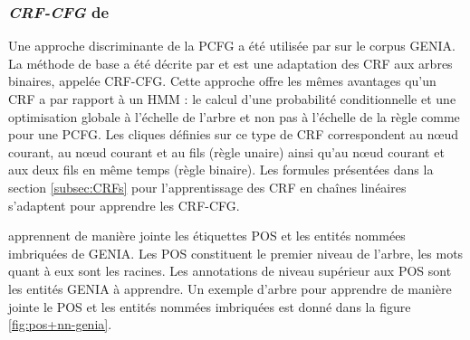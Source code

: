 \documentclass[12pt,a4paper,times,twoside,openright]{report}
\begin{document}
            \subsubsection{\textit{CRF-CFG} de \citet{finkel2009b}}
            \label{subsubsec:crf-finkel}
Une approche discriminante de la PCFG a été utilisée par \citet{finkel2009b} sur le corpus GENIA. La méthode de base a été décrite par \citet{finkel2008efficient} et est une adaptation des CRF aux arbres binaires, appelée CRF-CFG. Cette approche offre les mêmes avantages qu'un CRF a par rapport à un HMM : le calcul d'une probabilité conditionnelle et une optimisation globale à l'échelle de l'arbre et non pas à l'échelle de la règle comme pour une PCFG. Les cliques définies sur ce type de CRF correspondent au n\oe ud courant, au n\oe ud courant et au fils (règle unaire) ainsi qu'au n\oe ud courant et aux deux fils en même temps (règle binaire). Les formules présentées dans la section \ref{subsec:CRFs} pour l'apprentissage des CRF en chaînes linéaires s'adaptent pour apprendre les CRF-CFG.

\citet{finkel2009b} apprennent de manière jointe les étiquettes POS et les entités nommées imbriquées de GENIA. Les POS constituent le premier niveau de l'arbre, les mots quant à eux sont les racines. Les annotations de niveau supérieur aux POS sont les entités GENIA à apprendre. Un exemple d'arbre pour apprendre de manière jointe le POS et les entités nommées imbriquées est donné dans la figure \ref{fig:pos+nn-genia}.
\end{document}
